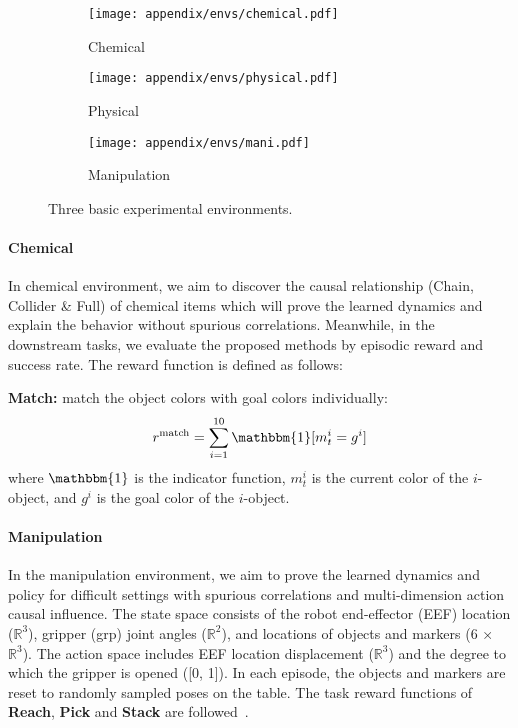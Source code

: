 \begin{figure}[h]
\centering
\begin{subfigure}{0.34\linewidth}
\texttt{[image: appendix/envs/chemical.pdf]}
\caption{Chemical}
\end{subfigure}
\hfill
\begin{subfigure}{0.32\linewidth}
\texttt{[image: appendix/envs/physical.pdf]}
\caption{Physical}
\end{subfigure}
\hfill
\begin{subfigure}{0.32\linewidth}
\texttt{[image: appendix/envs/mani.pdf]}
\caption{Manipulation}
\end{subfigure}
\hfill
\caption{Three basic experimental environments.}
\label{fig:abl_envs}
\end{figure}


\paragraph{Chemical}
In chemical environment, we aim to discover the causal relationship (Chain, Collider \& Full) of chemical items which will prove the learned dynamics and explain the behavior without spurious correlations. Meanwhile, in the downstream tasks, we evaluate the proposed methods by episodic reward and success rate. The reward function is defined as follows:

\textbf{Match:} match the object colors with goal colors individually:
\begin{equation}
    r^{\mathrm{match}}= \sum_{i=1}^{10}\mathbbm{1} [m^i_t=g^i]
\end{equation}
where $\mathbbm{1}$ is the indicator function, $m^i_t$ is the current color of the $i$-object, and $g^i$ is the goal color of the $i$-object.

\paragraph{Manipulation} In the manipulation environment, we aim to prove the learned dynamics and policy for difficult settings with spurious correlations and multi-dimension action causal influence.  The state space consists of the robot end-effector (EEF) location ($\mathbb{R}^3$), gripper (grp) joint angles ($\mathbb{R}^2$), and locations of objects and markers (6 × $\mathbb{R}^3$). The action space includes EEF location displacement ($\mathbb{R}^3$) and the degree to which the gripper is opened ([0, 1]).  In each episode, the objects and markers are reset to randomly sampled poses on the table. The task reward functions of \textbf{Reach}, \textbf{Pick} and \textbf{Stack} are followed~\citep{wang2022causal}.

